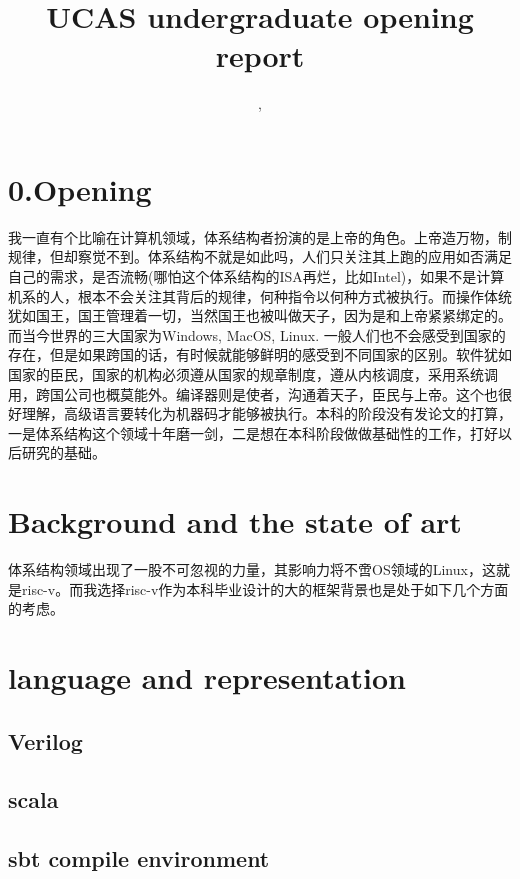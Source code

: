 \documentclass[11pt]{article}
\title{UCAS undergraduate opening report}
\author{\Name, \SID}
\date{}
\begin{document}
\maketitle
\section*{0.Opening}
我一直有个比喻在计算机领域，体系结构者扮演的是上帝的角色。上帝造万物，制规律，但却察觉不到。体系结构不就是如此吗，人们只关注其上跑的应用如否满足自己的需求，是否流畅(哪怕这个体系结构的ISA再烂，比如Intel)，如果不是计算机系的人，根本不会关注其背后的规律，何种指令以何种方式被执行。而操作体统犹如国王，国王管理着一切，当然国王也被叫做天子，因为是和上帝紧紧绑定的。而当今世界的三大国家为Windows, MacOS, Linux. 一般人们也不会感受到国家的存在，但是如果跨国的话，有时候就能够鲜明的感受到不同国家的区别。软件犹如国家的臣民，国家的机构必须遵从国家的规章制度，遵从内核调度，采用系统调用，跨国公司也概莫能外。编译器则是使者，沟通着天子，臣民与上帝。这个也很好理解，高级语言要转化为机器码才能够被执行。本科的阶段没有发论文的打算，一是体系结构这个领域十年磨一剑，二是想在本科阶段做做基础性的工作，打好以后研究的基础。

\section{Background and the state of art}
体系结构领域出现了一股不可忽视的力量，其影响力将不啻OS领域的Linux，这就是risc-v。而我选择risc-v作为本科毕业设计的大的框架背景也是处于如下几个方面的考虑。

\section{language and representation}
\subsection{Verilog}

\subsection{scala}

\subsection{sbt compile environment}
\end{document}
